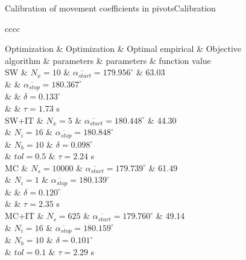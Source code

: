 \documentclass[10pt]{beamer}
\newcommand{\TABLE}[3]
{
	\begin{table}[ht!]
		\centering
		#1
		\tabulinesep=0.9mm
		\begin{tabu}{#2}
			#3
		\end{tabu}
	\end{table}
}
\begin{document}
\begin{frame}{Calibration of movement coefficients in pivots}{Calibration}
\TABLE{\tiny}{cccc}
{
	Optimization & Optimization & Optimal empirical & Objective
	\\ algorithm & parameters & parameters & function value
	\\ \hline
	SW & $N_x=10$ & $\overline{\alpha_{start}}=179.956^\circ$
	& 63.03
	\\ & & $\overline{\alpha_{stop}}=180.367^\circ$
	\\ & & $\delta=0.133^\circ$
	\\ & & $\tau=1.73$ s
	\\ \hline
	SW+IT & $N_x=5$ & $\overline{\alpha_{start}}=180.448^\circ$
	& 44.30
	\\ & $N_i=16$ & $\overline{\alpha_{stop}}=180.848^\circ$
	\\ & $N_b=10$ & $\delta=0.098^\circ$
	\\ & $tol=0.5$ & $\tau=2.24$ s
	\\ \hline
	MC & $N_s=10000$
	& $\overline{\alpha_{start}}=179.739^\circ$ & 61.49
	\\ & $N_i=1$ & $\overline{\alpha_{stop}}=180.139^\circ$
	\\ & & $\delta=0.120^\circ$
	\\ & & $\tau=2.35$ s
	\\ \hline
	MC+IT & $N_s=625$
	& $\overline{\alpha_{start}}=179.760^\circ$ & 49.14
	\\ & $N_i=16$ & $\overline{\alpha_{stop}}=180.159^\circ$
	\\ & $N_b=10$ & $\delta=0.101^\circ$
	\\ & $tol=0.1$ & $\tau=2.29$ s
	\\ \hline
}
\end{frame}
\end{document}
